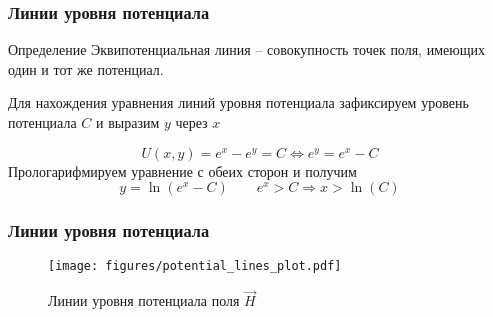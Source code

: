 \begin{frame}\frametitle{Линии уровня потенциала}
	\begin{block}{Определение}
		Эквипотенциальная линия -- совокупность точек поля, имеющих один и тот же
		потенциал.
	\end{block}

	Для нахождения уравнения линий уровня потенциала зафиксируем
	уровень потенциала \(C\) и выразим \(y\) через \(x\)

	\begin{equation}
		U(x, y) = e^x - e^y = C \Longleftrightarrow e^y = e^x - C
		\label{eq:potential_level_line}
	\end{equation}
	Прологарифмируем уравнение с обеих сторон и получим
	\begin{equation}
		y = \ln(e^x - C) \qquad e^x > C \Rightarrow x > \ln(C)
	\end{equation}

\end{frame}

\begin{frame}\frametitle{Линии уровня потенциала}
	\begin{figure}
		\centering
		\texttt{[image: figures/potential\_lines\_plot.pdf]}
    \caption{Линии уровня потенциала поля \(\vec H\)}\label{fig:potential_lines}
	\end{figure}

\end{frame}
